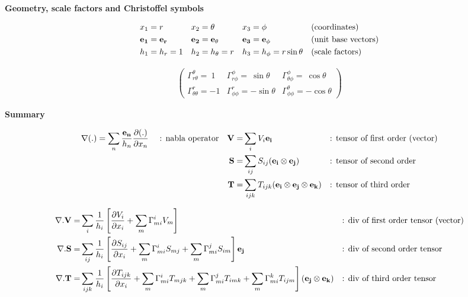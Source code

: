 \documentclass[11pt]{article}
\begin{document}
\begin{landscape}
\noindent
{{\bf{Geometry, scale factors and Christoffel symbols}}}

\begin{align}
& x_1 = r & & x_2 = \theta & & x_3 = \phi & & \mbox{(coordinates)} \\
& {\bf{e_1 = e_r}} & &  {\bf{e_2 = e_\theta}} & & {\bf{e_3 = e_\phi}} && \mbox{(unit base vectors)} \\
& h_1 = h_r = 1 & &  h_2 = h_\theta = r & & h_3 = h_\phi = r \sin{\theta} & & \mbox{(scale factors)}
\end{align}

\begin{align}
\begin{pmatrix}
\Gamma_{r\theta}^\theta = \ 1  &  \Gamma_{r\phi}^\phi = \ \sin{\theta} & \Gamma_{\theta \phi}^{\phi} = \ \cos{\theta}   \\
\Gamma_{\theta \theta}^r = -1   &  \Gamma_{\phi \phi}^r = -\sin{\theta}  & \Gamma_{\phi \phi}^{\theta} = -\cos{\theta}  
\end{pmatrix}
\end{align}

\noindent
{{\bf{Summary}}}

\begin{align}
\nabla (.) = \sum_n \frac{{\bf{e_n}}}{h_n}\frac{\partial (.)}{\partial x_n} \ \ \ \ \mbox{: nabla operator} & & {\bf{V}} = &  \sum_i V_i {\bf{{e_i}}} & & \mbox{: tensor of first order (vector)}\\
& & {\bf{S}} = &  \sum_{ij} S_{ij} ({\bf{e_i}} \otimes {\bf{e_j}}) & & {\mbox{: tensor of second order}}\\
& & {\bf{T}} = &  \sum_{ijk} T_{ijk} ({\bf{e_i}} \otimes {\bf{e_j}} \otimes {\bf{e_k}}) & & \mbox{: tensor of third order}
\end{align}

\begin{align}
\nabla . {\bf{V}} = & \sum_i \frac{1}{h_i} \left[ \frac{\partial V_i}{\partial x_i} + \sum_m \Gamma_{mi}^i V_m \right] & & \mbox{: div of first order tensor (vector)} \\
\nabla . {\bf{S}} = & \sum_{ij} \frac{1}{h_i} \left[ \frac{\partial S_{ij}}{\partial x_i} + \sum_m \Gamma_{mi}^i S_{mj} + \sum_m \Gamma_{mi}^j S_{im} \right] {\bf{e_j}} & & \mbox{: div of second order tensor} \\
\nabla . {\bf{T}} = & \sum_{ijk} \frac{1}{h_i} \left[ \frac{\partial T_{ijk}}{\partial x_i} + \sum_m \Gamma_{mi}^i T_{mjk} + \sum_m \Gamma_{mi}^j T_{imk} + \sum_m \Gamma_{mi}^k T_{ijm} \right]  ({\bf{e_j}} \otimes {\bf{e_k}}) & & \mbox{: div of third order tensor}
\end{align}


\end{landscape}
\end{document}
